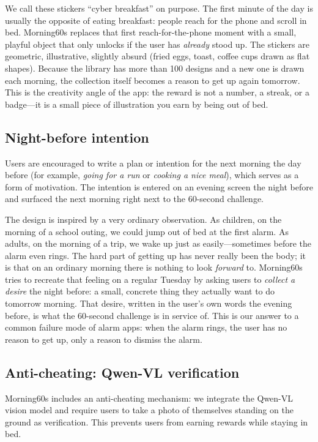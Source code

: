 \documentclass[manuscript,anonymous,review]{acmart}
\begin{document}
We call these stickers ``cyber breakfast'' on purpose. The first minute of the day is usually the opposite of eating breakfast: people reach for the phone and scroll in bed. Morning60s replaces that first reach-for-the-phone moment with a small, playful object that only unlocks if the user has \emph{already} stood up. The stickers are geometric, illustrative, slightly absurd (fried eggs, toast, coffee cups drawn as flat shapes). Because the library has more than 100 designs and a new one is drawn each morning, the collection itself becomes a reason to get up again tomorrow. This is the creativity angle of the app: the reward is not a number, a streak, or a badge---it is a small piece of illustration you earn by being out of bed.

\subsection{Night-before intention}
Users are encouraged to write a plan or intention for the next morning the day before (for example, \emph{going for a run} or \emph{cooking a nice meal}), which serves as a form of motivation. The intention is entered on an evening screen the night before and surfaced the next morning right next to the 60-second challenge.

The design is inspired by a very ordinary observation. As children, on the morning of a school outing, we could jump out of bed at the first alarm. As adults, on the morning of a trip, we wake up just as easily---sometimes before the alarm even rings. The hard part of getting up has never really been the body; it is that on an ordinary morning there is nothing to look \emph{forward} to. Morning60s tries to recreate that feeling on a regular Tuesday by asking users to \emph{collect a desire} the night before: a small, concrete thing they actually want to do tomorrow morning. That desire, written in the user's own words the evening before, is what the 60-second challenge is in service of. This is our answer to a common failure mode of alarm apps: when the alarm rings, the user has no reason to get up, only a reason to dismiss the alarm.

\subsection{Anti-cheating: Qwen-VL verification}
Morning60s includes an anti-cheating mechanism: we integrate the Qwen-VL vision model and require users to take a photo of themselves standing on the ground as verification. This prevents users from earning rewards while staying in bed.
\end{document}
